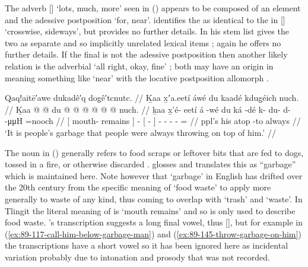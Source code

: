 The adverb  [] ‘lots, much, more’ seen in (\lastx) appears to be composed of an element  and the adessive postposition  ‘for, near’.
\textcite[08/217]{leer:1973} identifies the  as identical to the  in  [] ‘crosswise, sideways’, but provides no further details.
In his stem list \citeauthor{leer:1978b} gives the two as separate and so implicitly unrelated lexical items \parencite[35]{leer:1978b}; again he offers no further details.
If the final  is not the adessive postposition then another likely relation is the adverbial  ‘all right, okay, fine’ \parencite[f02/98]{leer:1973}; both may have an origin in  meaning something like ‘near’ with the locative postposition allomorph .

\ex\label{ex:89-113-ppl-throw-garbage}%
%
\begingl
	\glpreamble	Qaq!aitē′awe dukadê′q dog̣ê′tcnutc. //
	\glpreamble	Ḵaa x̱ʼa.eetí áwé du kaadé kdug̱éich nuch. //
	\gla	{} Ḵaa  @ {} {}  @ {}
		{} du  @ {} {}
		 @ {} @ {} @ {} @ {} @ \•nuch. //
	\glb	{} ḵaa x̱'é- eetí {} á -wé
		{} du ká -dé {}
		k- du- d-  -μμH =nooch //
	\glc	{}[  mouth- remains {}]  -
		{}[   - {}]
		- - -  - = //
	\gld	{} ppl’s  {} {}  {}
		{} his atop -to {}
		 {} {} {} {} \•always //
	\glft	‘It is people’s garbage that people were always throwing on top of him.’
		//
\endgl
\xe

The noun  in (\lastx) generally refers to food scraps or leftover bits that are fed to dogs, tossed in a fire, or otherwise discarded \parencite[02/248]{leer:1973}.
\citeauthor{swanton:1909} glosses and translates this as “garbage” which is maintained here.
Note however that ‘garbage’ in English has drifted over the 20th century from the specific meaning of ‘food waste’ to apply more generally to waste of any kind, thus coming to overlap with ‘trash’ and ‘waste’.
In Tlingit the literal meaning of  is ‘mouth remains’ and so is only used to describe food waste.
\citeauthor{swanton:1909}’s transcription  suggests a long final vowel, thus  [], but for example in (\ref{ex:89-117-call-him-below-garbage-man}) and (\ref{ex:89-145-throw-garbage-on-him}) the transcriptions have a short vowel so it has been ignored here as incidental variation probably due to intonation and prosody that was not recorded.

